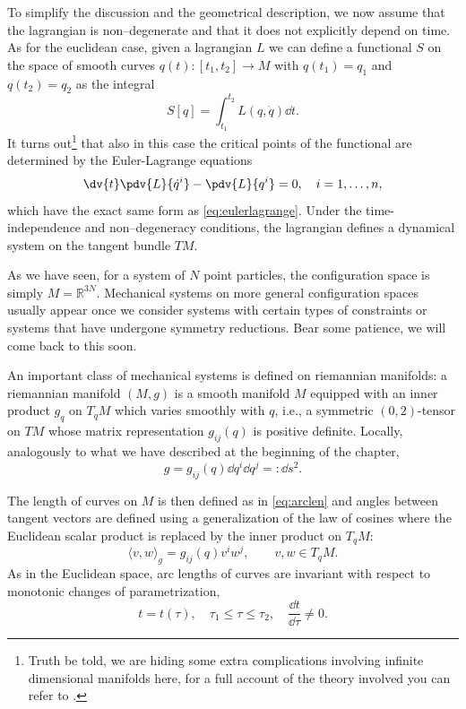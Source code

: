 \documentclass[english,fontsize=11pt,paper=b5]{scrbook}
\numberwithin{equation}{chapter}
\theoremstyle{definition}
\begin{document}
    To simplify the discussion and the geometrical description, we now assume that the lagrangian is non--degenerate and that it does not explicitly depend on time.
    As for the euclidean case, given a lagrangian $L$ we can define a functional $S$ on the space of smooth curves $q(t): [t_1,t_2] \to M$ with $q(t_1) = q_1$ and $q(t_2) = q_2$ as the integral
    \begin{equation}
      S[q] = \int_{t_1}^{t_2} L(q,\dot q) \dd t.
    \end{equation}
    It turns out\footnote{Truth be told, we are hiding some extra complications involving infinite dimensional manifolds here, for a full account of the theory involved you can refer to \cite[Chapters 7 and 8]{book:marsdenratiu}.} that also in this case the critical points of the functional are determined by the Euler-Lagrange equations
    \begin{equation}
      \dv{t}\pdv{L}{\dot q^i} - \pdv{L}{q^i} =0, \quad i=1,\ldots,n,
    \end{equation}
    which have the exact same form as \eqref{eq:eulerlagrange}.
    Under the time-independence and non--degeneracy conditions, the lagrangian defines a dynamical system on the tangent bundle $TM$.

    As we have seen, for a system of $N$ point particles, the configuration space is simply $M=\mathbb{R}^{3N}$. Mechanical systems on more general configuration spaces usually appear once we consider systems with certain types of constraints or systems that have undergone symmetry reductions.
    Bear some patience, we will come back to this soon.
    \medskip

    An important class of mechanical systems is defined on riemannian manifolds: a riemannian manifold $(M, g)$ is a smooth manifold $M$ equipped with an inner product $g_q$ on $T_q M$ which varies smoothly with $q$, i.e., a symmetric $(0,2)$-tensor on $TM$ whose matrix representation $g_{ij}(q)$ is positive definite.
    Locally, analogously to what we have described at the beginning of the chapter,
    \begin{equation}
      g = g_{ij}(q) \dd q^i \dd q^j =: \dd s^2.
    \end{equation}

    The length of curves on $M$ is then defined as in \eqref{eq:arclen} and angles between tangent vectors are defined using a generalization of the law of cosines where the Euclidean scalar product is replaced by the inner product on $T_qM$:
    \begin{equation}
      \langle v, w\rangle_g = g_{ij}(q) v^i w^j, \qquad v,w\in T_q M.
    \end{equation}
    As in the Euclidean space, arc lengths of curves are invariant with respect to monotonic changes of parametrization,
    \begin{equation}
      t = t(\tau),\quad \tau_1\leq \tau\leq \tau_2, \quad \frac{\dd t}{\dd \tau}\neq 0.
    \end{equation}
\end{document}
